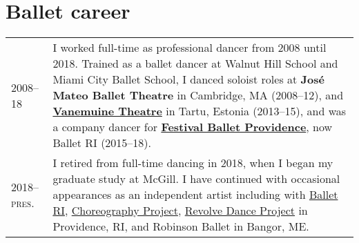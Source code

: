 \documentclass[11pt,a4paper]{article}
\begin{document}
  \section{Ballet career}
  \begin{longtable}{p{1.7cm}|p{15cm}}
    \textsc{2008--18}
    &%
    I worked full-time as professional dancer from 2008 until 2018. Trained as a
    ballet dancer at Walnut Hill School and Miami City Ballet School, I danced
    soloist roles at \textbf{José Mateo Ballet Theatre} in Cambridge, MA
    (2008--12), and \href{http://vanemuine.ee}{\textbf{Vanemuine Theatre}} in
    Tartu, Estonia (2013--15), and was a company dancer for
    \href{http://festivalballetprovidence.org}{\textbf{Festival Ballet
    Providence}}, now Ballet RI (2015--18).\\
    \textsc{2018--pres.}
    &%
    I retired from full-time dancing in 2018, when I began my graduate study at
    McGill. I have continued with occasional appearances as an independent
    artist including with 
    \href{https://balletri.org/}{Ballet RI},
    \href{https://www.choreographyproject.org/}{Choreography Project},
    \href{https://www.revolvedanceproject.com/}{Revolve Dance Project} in Providence, RI,
    and Robinson Ballet in Bangor, ME.\\
  \end{longtable}

  
\end{document}

